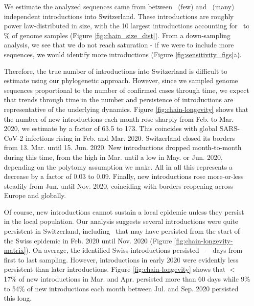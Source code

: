\documentclass[9pt,twoside,lineno]{pnas-new} %
\begin{document}
We estimate the analyzed sequences came from between \nchainsmin\ (few) and \nchainsmax\ (many) independent introductions into Switzerland. These introductions are roughly power law-distributed in size, with the 10 largest introductions accounting for \maxlargestchainsper\ to \minlargestchainsper \% of genome samples (Figure \ref{fig:chain_size_dist}). From a down-sampling analysis, we see that we do not reach saturation - if we were to include more sequences, we would identify more introductions (Figure \ref{fig:sensitivity_figs}a). 


Therefore, the true number of introductions into Switzerland is difficult to estimate using our phylogenetic approach. However, since we sampled genome sequences proportional to the number of confirmed cases through time, we expect that trends through time in the number and persistence of introductions are representative of the underlying dynamics. Figure \ref{fig:chain-longevity} shows that the number of new introductions each month rose sharply from Feb. to Mar. 2020, we estimate by a factor of 63.5 to 173. This coincides with global SARS-CoV-2 infections rising in Feb. and Mar. 2020. Switzerland closed its borders from 13. Mar. until 15. Jun. 2020. New introductions dropped month-to-month during this time, from the high in Mar. until a  low in May. or Jun. 2020, depending on the polytomy assumption we make. All in all this represents a decrease by a factor of 0.03 to 0.09. Finally, new introductions rose more-or-less steadily from Jun. until Nov. 2020, coinciding with borders reopening across Europe and globally. 

Of course, new introductions cannot sustain a local epidemic unless they persist in the local population. Our analysis suggests several introductions were quite persistent in Switzerland, including \nspanningchainsfebnovmin\ that may have persisted from the start of the Swiss epidemic in Feb. 2020 until Nov. 2020 (Figure \ref{fig:chain-longevity-matrix}). On average, the identified Swiss introductions persisted \meantimetolastsamplemax\ - \meantimetolastsamplemin\ days from first to last sampling. However, introductions in early 2020 were evidently less persistent than later introductions. Figure \ref{fig:chain-longevity} shows that $<$ 17\% of new introductions in Mar. and Apr. persisted more than 60 days while  9\% to 54\% of new introductions each month between Jul. and Sep. 2020 persisted this long. 
\end{document}
